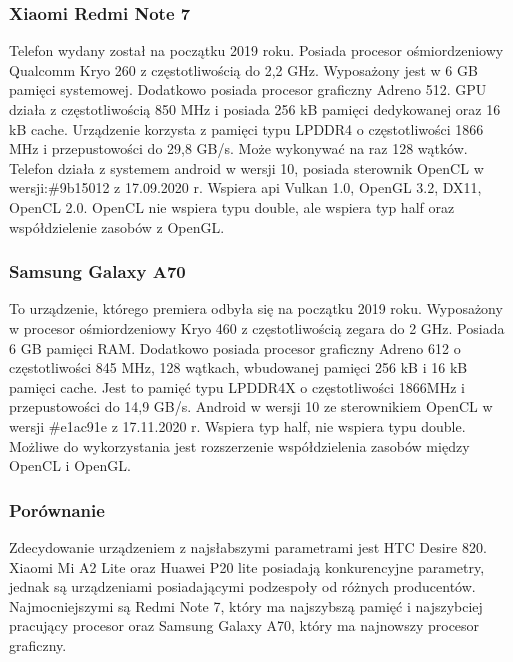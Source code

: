 \subsubsection[Xiaomi Redmi Note 7]{Xiaomi Redmi Note 7}
Telefon wydany został na początku 2019 roku. Posiada procesor ośmiordzeniowy Qualcomm Kryo 260 z częstotliwością do 2,2 GHz. Wyposażony jest w 6 GB pamięci systemowej. Dodatkowo posiada procesor graficzny Adreno 512. GPU działa z częstotliwością 850 MHz i posiada 256 kB pamięci dedykowanej oraz 16 kB cache. Urządzenie korzysta z pamięci typu LPDDR4 o częstotliwości 1866 MHz i przepustowości do 29,8 GB/s. Może wykonywać na raz 128 wątków. Telefon działa z systemem android w wersji 10, posiada sterownik OpenCL w wersji:\#9b15012 z 17.09.2020 r. Wspiera api Vulkan 1.0, OpenGL 3.2, DX11, OpenCL 2.0. OpenCL nie wspiera typu double, ale wspiera typ half oraz współdzielenie zasobów z OpenGL.
\subsubsection[Samsung Galaxy A70]{Samsung Galaxy A70}
To urządzenie, którego premiera odbyła się na początku 2019 roku. Wyposażony w procesor ośmiordzeniowy Kryo 460 z częstotliwością zegara do 2 GHz. Posiada 6 GB pamięci RAM. Dodatkowo posiada procesor graficzny Adreno 612 o częstotliwości 845 MHz, 128 wątkach, wbudowanej pamięci 256 kB i 16 kB pamięci cache. Jest to pamięć typu LPDDR4X o częstotliwości 1866MHz i przepustowości do 14,9 GB/s. Android w wersji 10 ze sterownikiem OpenCL w wersji \#e1ac91e z 17.11.2020 r. Wspiera typ half, nie wspiera typu double. Możliwe do wykorzystania jest rozszerzenie współdzielenia zasobów między OpenCL i OpenGL.
\subsubsection[Porównanie]{Porównanie}
Zdecydowanie urządzeniem z najsłabszymi parametrami jest HTC Desire 820. Xiaomi Mi A2 Lite oraz Huawei P20 lite posiadają konkurencyjne parametry, jednak są urządzeniami posiadającymi podzespoły od różnych producentów. Najmocniejszymi są Redmi Note 7, który ma najszybszą pamięć i najszybciej pracujący procesor oraz Samsung Galaxy A70, który ma najnowszy procesor graficzny.

